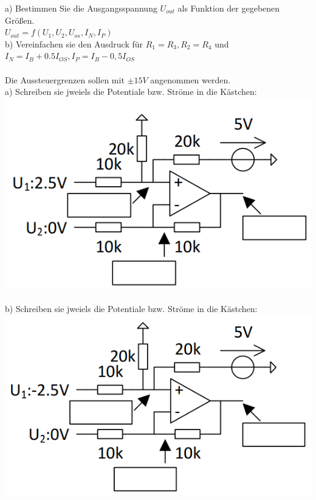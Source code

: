 \documentclass[A4]{scrartcl}
\begin{document}
  a) Bestimmen Sie die Ausgangsspannung $U_{out}$ als Funktion der gegebenen Größen.\\
  $U_{out} = f(U_1,U_2,U_{os},I_N,I_P)$\\
  b) Vereinfachen sie den Ausdruck für $R_1 = R_3, R_2 = R_4$ und $I_N = I_B + 0.5 I_{OS}, I_P = I_B-0,5I_{OS}$\\\\
  Die Aussteuergrenzen sollen mit $\pm 15V$ angenommen werden.\\
  a) Schreiben sie jweiels die Potentiale bzw. Ströme in die Kästchen:\\
  \includegraphics{Schaltung2.png}\\\\
  b) Schreiben sie jweiels die Potentiale bzw. Ströme in die Kästchen:\\
  \includegraphics{Schaltung3.png}\\\\
  
\end{document}
